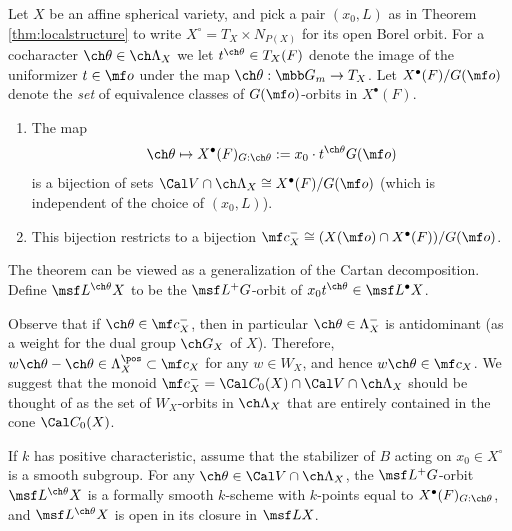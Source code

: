 Let $X$ be an affine spherical variety, and pick a pair $(x_0, L)$ as in Theorem \ref{thm:localstructure} to write $X^\circ= T_X \times N_{P(X)}$ for its open Borel orbit.
For a cocharacter $\ch\theta\in \ch\Lambda_X$ we let $t^{\ch\theta} \in T_X(F)$
denote the image of the uniformizer $t\in \mf o$ under the map $\ch\theta: \mbb G_m \to T_X$.
Let $X^\bullet (F)/ G(\mf o)$ denote the \emph{set} of equivalence
classes of $G(\mf o)$-orbits in $X^\bullet (F)$.

\begin{thm}
\notready \label{thm:Gorbits}
\begin{enumerate}
\item The map
\begin{equation}
 \ch\theta \mapsto
X^\bullet(F)_{G:\ch\theta} := x_0 \cdot t^{\ch\theta} G(\mf o)
\end{equation}
is a bijection of sets $\Cal V \cap \ch\Lambda_X \cong X^\bullet(F)/ G(\mf o)$ (which is independent of the choice of $(x_0,L)$).
\item This bijection restricts to a bijection $\mf c_X^-
\cong (X(\mf o)\cap X^\bullet(F))/ G(\mf o)$.
\end{enumerate}
\end{thm}

The theorem can be viewed as a generalization of the Cartan decomposition.
Define $\msf L^{\ch\theta} X$ to be the $\msf L^+G$-orbit of $x_0 t^{\ch\theta} \in \msf L^\bullet X$.



\begin{rem}
\notready \label{rem:C0V}
Observe that if $\ch\theta\in \mf c_X^-$, then
in particular $\ch\theta\in \Lambda^-_X$ is antidominant (as a weight for the dual group $\ch G_X$ of $X$).
Therefore, $w\ch\theta- \ch\theta\in \Lambda^\pos_X \subset \mf c_X$ for any $w\in W_X$, and hence $w\ch\theta\in \mf c_X$.
We suggest that the monoid $\mf c_X^- = \Cal C_0(X) \cap \Cal V \cap \ch\Lambda_X$ should be
thought of as the set of $W_X$-orbits in $\ch\Lambda_X$ that are entirely
contained in the cone $\Cal C_0(X)$.
\end{rem}


\begin{prop}
\notready \label{prop:smoothfiberstrata}
If $k$ has positive characteristic,
assume that the stabilizer of $B$ acting on $x_0 \in X^\circ$ is a smooth subgroup.
For any $\ch\theta \in \Cal V \cap \ch\Lambda_X$,
the $\msf L^+G$-orbit $\msf L^{\ch\theta} X$ is a formally smooth $k$-scheme
with $k$-points equal to $X^\bullet(F)_{G:\ch\theta}$, and
$\msf L^{\ch\theta} X$ is open in its closure in $\msf L X$.
\end{prop}

